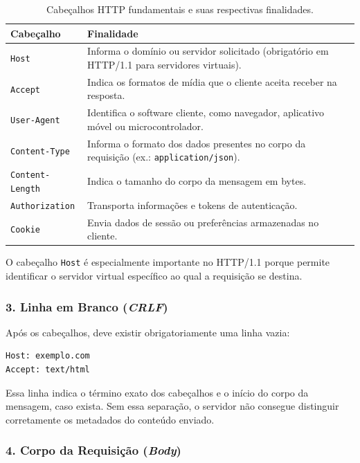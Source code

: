 \begin{table}[h!]
\centering
\fontsize{10}{12}\selectfont
\caption{Cabeçalhos HTTP fundamentais e suas respectivas finalidades.}
\begin{tabular}{|l|p{10cm}|}
\hline
\textbf{Cabeçalho} & \textbf{Finalidade} \\ \hline
\texttt{Host} & Informa o domínio ou servidor solicitado (obrigatório em HTTP/1.1 para servidores virtuais). \\ \hline
\texttt{Accept} & Indica os formatos de mídia que o cliente aceita receber na resposta. \\ \hline
\texttt{User-Agent} & Identifica o software cliente, como navegador, aplicativo móvel ou microcontrolador. \\ \hline
\texttt{Content-Type} & Informa o formato dos dados presentes no corpo da requisição (ex.: \texttt{application/json}). \\ \hline
\texttt{Content-Length} & Indica o tamanho do corpo da mensagem em bytes. \\ \hline
\texttt{Authorization} & Transporta informações e tokens de autenticação. \\ \hline
\texttt{Cookie} & Envia dados de sessão ou preferências armazenadas no cliente. \\ \hline
\end{tabular}
\end{table}

O cabeçalho \texttt{Host} é especialmente importante no HTTP/1.1 porque permite identificar o servidor virtual específico ao qual a requisição se destina.

\subsubsection*{3. Linha em Branco (\textit{CRLF})}

Após os cabeçalhos, deve existir obrigatoriamente uma linha vazia:

\begin{lstlisting}
Host: exemplo.com
Accept: text/html

\end{lstlisting}

Essa linha indica o término exato dos cabeçalhos e o início do corpo da mensagem, caso exista. Sem essa separação, o servidor não consegue distinguir corretamente os metadados do conteúdo enviado.

\subsubsection*{4. Corpo da Requisição (\textit{Body})}

